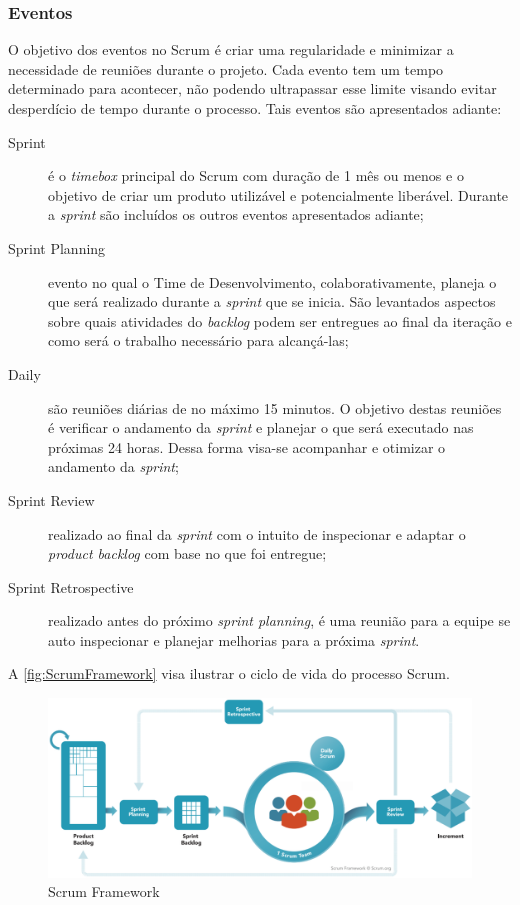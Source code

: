 \subsubsection{Eventos}

O objetivo dos eventos no Scrum é criar uma regularidade e minimizar a necessidade
de reuniões durante o projeto. Cada evento tem um tempo determinado para acontecer,
não podendo ultrapassar esse limite visando evitar desperdício de tempo durante o
processo. Tais eventos são apresentados adiante:

\begin{description}
    \item[Sprint] é o \textit{timebox} principal do Scrum com duração de 1 mês ou
    menos e o objetivo de criar um produto utilizável e potencialmente liberável.
    Durante a \textit{sprint} são incluídos os outros eventos apresentados adiante;
    \item[Sprint Planning] evento no qual o Time de Desenvolvimento, colaborativamente,
    planeja o que será realizado durante a \textit{sprint} que se inicia. São
    levantados aspectos sobre quais atividades do \textit{backlog} podem ser entregues
    ao final da iteração e como será o trabalho necessário para alcançá-las;
    \item[Daily] são reuniões diárias de no máximo 15 minutos. O objetivo destas
    reuniões é verificar o andamento da \textit{sprint} e planejar o que será executado
    nas próximas 24 horas. Dessa forma visa-se acompanhar e otimizar o andamento da
    \textit{sprint};
    \item[Sprint Review] realizado ao final da \textit{sprint} com o intuito de
    inspecionar e adaptar o \textit{product backlog} com base no que foi entregue;
    \item[Sprint Retrospective] realizado antes do próximo \textit{sprint planning}, é
    uma reunião para a equipe se auto inspecionar e planejar melhorias para a próxima
    \textit{sprint}.
\end{description}

A \autoref{fig:ScrumFramework} visa ilustrar o ciclo de vida do processo Scrum.

    \begin{figure}[h]
      \centering
      \includegraphics[keepaspectratio=true,scale=0.4]{figuras/scrumFramework.eps}
      \caption{Scrum Framework\label{fig:ScrumFramework}}
    \end{figure}

